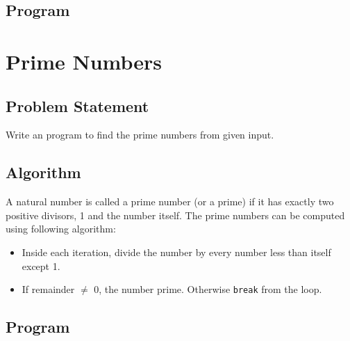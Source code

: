 \documentclass[11pt]{report}
\begin{document}
\section{Program}

  
\chapter{Prime Numbers}
\section{Problem Statement}
Write an program to find the prime numbers from given input.
\section{Algorithm}
A natural number is called a prime number (or a prime) if it has exactly two positive divisors, 1 and the number itself. The prime numbers can be computed using following algorithm:
\begin{itemize}
\item Inside each iteration, divide the number by every number less than itself except 1.
\item If remainder $\neq$ 0, the number prime. Otherwise \texttt{break} from the loop.
\end{itemize}
\section{Program}

\end{document}
